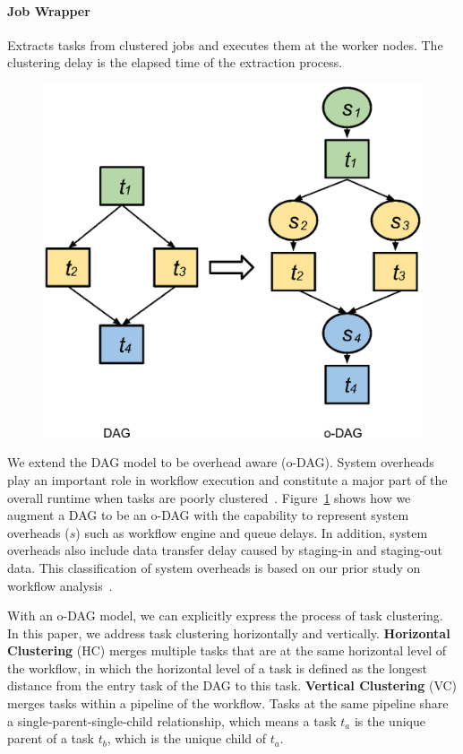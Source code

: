 \documentclass[final,5p,times,twocolumn]{elsarticle}
\begin{document}
\paragraph{Job Wrapper} Extracts tasks from clustered jobs and executes them at the worker nodes. The clustering delay is the  elapsed time of the extraction process.

\begin{figure}[!htb]
	\centering
	\includegraphics[width=0.7\linewidth]{figure2.eps}
	\label{fig:model_odag}
\end{figure}

We extend the DAG model to be overhead aware (o-DAG). System overheads play an important role in workflow execution and constitute a major part of the overall runtime when tasks are poorly clustered~\cite{Chen2011}. Figure~\ref{fig:model_odag} shows how we augment a DAG to be an o-DAG with the capability to represent system overheads ($s$) such as workflow engine and queue delays. In addition, system overheads also include data transfer delay caused by staging-in and staging-out data. This classification of system overheads is based on our prior study on workflow analysis~\cite{Chen2011}. 

With an o-DAG model, we can explicitly express the process of task clustering. In this paper, we address task clustering horizontally and vertically. \textbf{Horizontal Clustering} (HC) merges multiple tasks that are at the same horizontal level of the workflow, in which the horizontal level of a task is defined as the longest distance from the entry task of the DAG to this task. \textbf{Vertical Clustering} (VC) merges tasks within a pipeline of the workflow. Tasks at the same pipeline share a single-parent-single-child relationship, which means a task $t_a$ is the unique parent of a task $t_b$, which is the unique child of $t_a$. 
\end{document}
